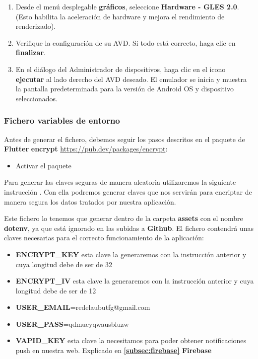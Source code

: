 \begin{enumerate}
	\item Desde el menú desplegable \textbf{gráficos}, seleccione \textbf{Hardware - GLES 2.0}. (Esto habilita la aceleración de hardware y mejora el rendimiento de renderizado).
	\item Verifique la configuración de su AVD. Si todo está correcto, haga clic en \textbf{finalizar}.
	\item En el diálogo del Administrador de dispositivos, haga clic en el icono \textbf{ejecutar} al lado derecho del AVD deseado. El emulador se inicia y muestra la pantalla predeterminada para la versión de Android OS y dispositivo seleccionados.
\end{enumerate}

\subsubsection{Fichero variables de entorno}
Antes de generar el fichero, debemos seguir los pasos descritos en el paquete de \textbf{Flutter} \textbf{encrypt} \url{https://pub.dev/packages/encrypt}:
\begin{itemize}
	\item Activar el paquete \fboxrule=1pt\fboxsep=4pt
\end{itemize}

Para generar las claves seguras de manera aleatoria utilizaremos la siguiente instrucción \fboxrule=1pt\fboxsep=4pt. Con ella podremos generar claves que nos servirán para encriptar de manera segura los datos tratados por nuestra aplicación.

Este fichero lo tenemos que generar dentro de la carpeta \textbf{assets} con el nombre \textbf{dotenv}, ya que está ignorado en las subidas a \textbf{Github}. El fichero contendrá unas claves necesarias para el correcto funcionamiento de la aplicación:
\begin{itemize}
	\item \textbf{ENCRYPT\_KEY} esta clave la generaremos con la instrucción anterior y cuya longitud debe de ser de 32
	\item \textbf{ENCRYPT\_IV }esta clave la generaremos con la instrucción anterior y cuya longitud debe de ser de 12
	\item \textbf{USER\_EMAIL}=redelaubutfg@gmail.com
	\item \textbf{USER\_PASS}=qdmucyqwausbluzw
	\item \textbf{VAPID\_KEY} esta clave la necesitamos para poder obtener notificaciones push en nuestra web. Explicado en \textbf{\ref{subsec:firebase} Firebase}
\end{itemize}

